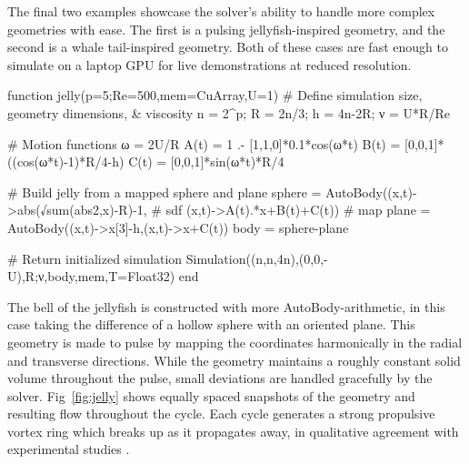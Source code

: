 \documentclass[final,3p,times]{elsarticle}
\begin{document}
The final two examples showcase the solver's ability to handle more complex geometries with ease. The first is a pulsing jellyfish-inspired geometry, and the second is a whale tail-inspired geometry. Both of these cases are fast enough to simulate on a laptop GPU for live demonstrations at reduced resolution.

\begin{jllisting}
function jelly(p=5;Re=500,mem=CuArray,U=1)
    # Define simulation size, geometry dimensions, & viscosity
    n = 2^p; R = 2n/3; h = 4n-2R; ν = U*R/Re

    # Motion functions
    ω = 2U/R
    A(t) = 1 .- [1,1,0]*0.1*cos(ω*t)
    B(t) = [0,0,1]*((cos(ω*t)-1)*R/4-h)
    C(t) = [0,0,1]*sin(ω*t)*R/4

    # Build jelly from a mapped sphere and plane
    sphere = AutoBody((x,t)->abs(√sum(abs2,x)-R)-1, # sdf
                      (x,t)->A(t).*x+B(t)+C(t))     # map
    plane = AutoBody((x,t)->x[3]-h,(x,t)->x+C(t))
    body =  sphere-plane

    # Return initialized simulation
    Simulation((n,n,4n),(0,0,-U),R;ν,body,mem,T=Float32)
end
\end{jllisting}

The bell of the jellyfish is constructed with more AutoBody-arithmetic, in this case taking the difference of a hollow sphere with an oriented plane. This geometry is made to pulse by mapping the coordinates harmonically in the radial and transverse directions. While the geometry maintains a roughly constant solid volume throughout the pulse, small deviations are handled gracefully by the solver. Fig~\ref{fig:jelly} shows equally spaced snapshots of the geometry and resulting flow throughout the cycle. Each cycle generates a strong propulsive vortex ring which breaks up as it propagates away, in qualitative agreement with experimental studies \cite{dabiri2005}.



\end{document}
